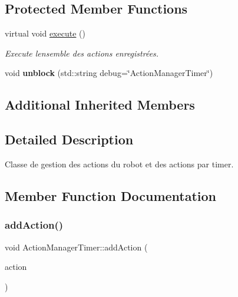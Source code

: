 \subsection*{Protected Member Functions}
\begin{DoxyCompactItemize}
\item 
\mbox{\label{classActionManagerTimer_a8eb81df877c40053d71f659265882058}} 
virtual void \hyperlink{classActionManagerTimer_a8eb81df877c40053d71f659265882058}{execute} ()
\begin{DoxyCompactList}\small\item\em Execute l\textquotesingle{}ensemble des actions enregistrées. \end{DoxyCompactList}\item 
\mbox{\label{classActionManagerTimer_a39f4cbb5ddbbe6a40980bb59b8b59b05}} 
void {\bfseries unblock} (std\+::string debug=\char`\"{}Action\+Manager\+Timer\char`\"{})
\end{DoxyCompactItemize}
\subsection*{Additional Inherited Members}


\subsection{Detailed Description}
Classe de gestion des actions du robot et des actions par timer. 

\subsection{Member Function Documentation}
\mbox{\label{classActionManagerTimer_ad44aa7bf3d361e60d3ed764d833eafc5}} 
\subsubsection{\texorpdfstring{add\+Action()}{addAction()}}
{\footnotesize\ttfamily void Action\+Manager\+Timer\+::add\+Action (\begin{DoxyParamCaption}\item[{\hyperlink{classIAction}{I\+Action} $\ast$}]{action }\end{DoxyParamCaption})\hspace{0.3cm}{\ttfamily [inline]}}



